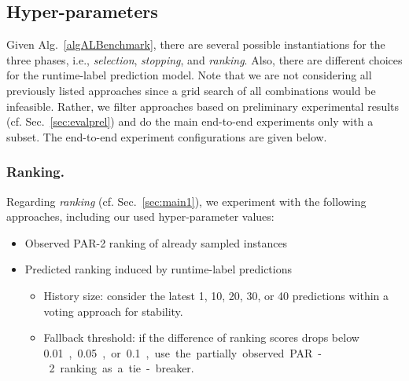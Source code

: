 \documentclass[runningheads]{llncs}
\begin{document}
\subsection{Hyper-parameters}
\label{sec:hyper}
Given Alg.~\ref{algALBenchmark}, there are several possible instantiations for the three phases, i.e., \textit{selection}, \textit{stopping}, and \textit{ranking}.
Also, there are different choices for the runtime-label prediction model.
Note that we are not considering all previously listed approaches since a grid search of all combinations would be infeasible. Rather, we filter approaches based on preliminary experimental results (cf. Sec.~\ref{sec:evalprel}) and do the main end-to-end experiments only with a subset.
The end-to-end experiment configurations are given below.

\subsubsection{Ranking.}
Regarding \textit{ranking} (cf. Sec.~\ref{sec:main1}), we experiment with the following approaches, including our used hyper-parameter values:
\begin{itemize}
  \item Observed PAR-2 ranking of already sampled instances
  \item Predicted ranking induced by runtime-label predictions
  \begin{itemize}
    \item History size: consider the latest 1, 10, 20, 30, or 40 predictions within a voting approach for stability.
    \item Fallback threshold: if the difference of ranking scores drops below \SI{0.01}, \SI{0.05}, or \SI{0.1}, use the partially observed PAR-2 ranking as a tie-breaker.
  \end{itemize}
\end{itemize}
\end{document}

